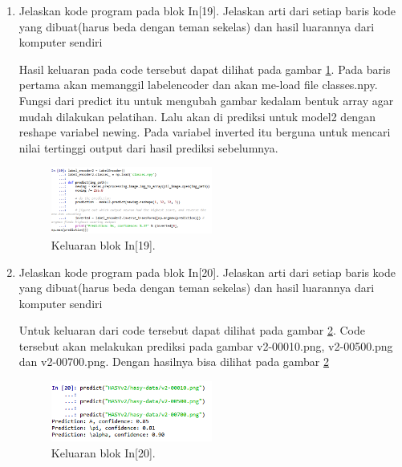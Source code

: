 \begin{enumerate}
\item Jelaskan kode program pada blok In[19]. Jelaskan arti dari setiap baris kode yang dibuat(harus beda dengan teman sekelas) dan hasil luarannya dari komputer sendiri \par

Hasil keluaran pada code tersebut dapat dilihat pada gambar \ref{math19}. Pada baris pertama akan memanggil labelencoder dan akan me-load file classes.npy. Fungsi dari predict itu untuk mengubah gambar kedalam bentuk array agar mudah dilakukan pelatihan. Lalu akan di prediksi untuk model2 dengan reshape variabel newing. Pada variabel inverted itu berguna untuk mencari nilai tertinggi output dari hasil prediksi sebelumnya.
		\begin{figure}[!htbp]
		\centerline{\includegraphics[width=0.5\textwidth]{figures/im/math19.png}}
		\caption{Keluaran blok In[19].}
		\label{math19}
		\end{figure}

\item Jelaskan kode program pada blok In[20]. Jelaskan arti dari setiap baris kode yang dibuat(harus beda dengan teman sekelas) dan hasil luarannya dari komputer sendiri \par

Untuk keluaran dari code tersebut dapat dilihat pada gambar \ref{math20}. Code tersebut akan melakukan prediksi pada gambar v2-00010.png, v2-00500.png dan v2-00700.png. Dengan hasilnya bisa dilihat pada gambar \ref{math20}
		\begin{figure}[!htbp]
		\centerline{\includegraphics[width=0.5\textwidth]{figures/im/math20.png}}
		\caption{Keluaran blok In[20].}
		\label{math20}
		\end{figure}
\end{enumerate}

